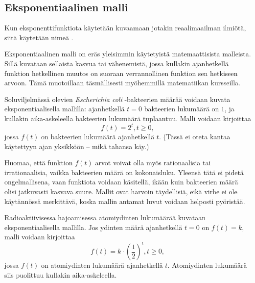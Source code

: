 \subsection*{Eksponentiaalinen malli}

Kun eksponenttifunktiota käytetään kuvaamaan jotakin reaalimaailman ilmiötä, siitä käytetään nimeä .

Eksponentiaalinen malli on eräs yleisimmin käytetyistä matemaattisista malleista. Sillä kuvataan sellaista kasvua tai vähenemistä, jossa kullakin ajanhetkellä funktion hetkellinen muutos on suoraan verrannollinen funktion sen hetkiseen arvoon. Tämä muotoillaan täsmällisesti myöhemmillä matematiikan kursseilla.

\begin{esimerkki}
Soluviljelmässä olevien \textit{Escherichia coli} -bakteerien määrää voidaan kuvata eksponentiaalisella mallilla: ajanhetkellä $t = 0$ bakteerien lukumäärä on $1$, ja kullakin aika-askeleella bakteerien lukumäärä tuplaantuu. Malli voidaan kirjoittaa %
\[
f(t) = 2^t, t \ge 0,
\]
jossa $f(t)$ on bakteerien lukumäärä ajanhetkellä $t$. (Tässä ei oteta kantaa käytettyyn ajan yksikköön -- mikä tahansa käy.)

Huomaa, että funktion $f(t)$ arvot voivat olla myös rationaalisia tai irrationaalisia, vaikka bakteerien määrä on kokonaisluku. Yleensä tätä ei pidetä ongelmallisena, vaan funktiota voidaan käsitellä, ikään kuin bakteerien määrä olisi jatkuvasti kasvava suure. Mallit ovat harvoin täydellisiä, eikä virhe ei ole käytännössä merkittävä, koska mallin antamat luvut voidaan helposti pyöristää.

\begin{center}
	\begin{kuvaajapohja}{0.8}{0}{6}{-1}{9} %
	\end{kuvaajapohja}
\end{center}

\end{esimerkki}

\begin{esimerkki}
Radioaktiivisessa hajoamisessa atomiydinten lukumäärää kuvataan eksponentiaalisella mallilla. Jos ydinten määrä ajanhetkellä $t = 0$ on $f(t) = k$, malli voidaan kirjoittaa
\[
f(t) = k \cdot \left( \frac{1}{2} \right)^t, t \ge 0,
\]
jossa $f(t)$ on atomiydinten lukumäärä ajanhetkellä $t$. Atomiydinten lukumäärä siis puolittuu kullakin aika-askeleella.
\end{esimerkki}

